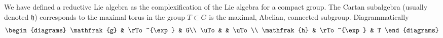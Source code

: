 We have defined a reductive Lie algebra as the complexification
of the Lie algebra for a compact group. The Cartan subalgebra
(usually denoted $\mathfrak{h}$) corresponds to the maximal torus
in the group $T\subset G$ is the maximal, Abelian, connected
subgroup. Diagrammatically 
\begin{equation}
\begin{diagrams}
\mathfrak{g} & \rTo^{\exp} & G\\
\uTo         &             & \uTo\\
\mathfrak{h} & \rTo^{\exp} & T
\end{diagrams}
\end{equation}
